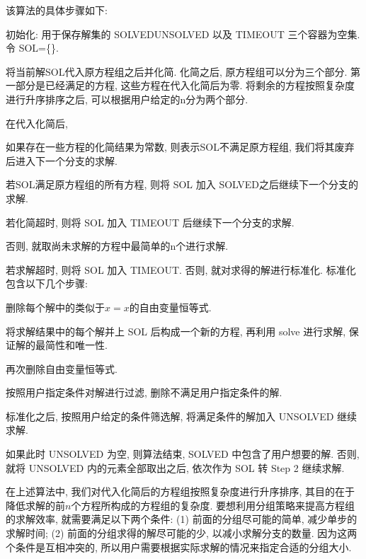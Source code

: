 该算法的具体步骤如下:
\begin{compactenum}[Step 1.]
\item 初始化: 用于保存解集的 SOLVED\D UNSOLVED 以及 TIMEOUT 三个容器为空集. 令 SOL=\{\}. 
\item 将当前解SOL代入原方程组之后并化简. 化简之后, 原方程组可以分为三个部分. 第一部分是已经满足的方程, 这些方程在代入化简后为零. 将剩余的方程按照复杂度进行升序排序之后, 可以根据用户给定的n分为两个部分. 
\item 在代入化简后, 
    \begin{compactenum}[(a)]
    \item 如果存在一些方程的化简结果为常数, 则表示SOL不满足原方程组, 我们将其废弃后进入下一个分支的求解. 
    \item 若SOL满足原方程组的所有方程, 则将 SOL 加入 SOLVED之后继续下一个分支的求解. 
    \item 若化简超时, 则将 SOL 加入 TIMEOUT 后继续下一个分支的求解. 
    \item 否则, 就取尚未求解的方程中最简单的n个进行求解.
    \end{compactenum}
\item 若求解超时, 则将 SOL 加入 TIMEOUT. 否则, 就对求得的解进行标准化. 标准化包含以下几个步骤:
    \begin{compactenum}[(1)]
    \item 删除每个解中的类似于$x=x$的自由变量恒等式.
    \item 将求解结果中的每个解并上 SOL 后构成一个新的方程, 再利用 solve 进行求解, 保证解的最简性和唯一性. 
    \item 再次删除自由变量恒等式.
    \item 按照用户指定条件对解进行过滤, 删除不满足用户指定条件的解. 
    \end{compactenum}
\item 标准化之后, 按照用户给定的条件筛选解, 将满足条件的解加入 UNSOLVED 继续求解. 
\item 如果此时 UNSOLVED 为空, 则算法结束, SOLVED 中包含了用户想要的解. 否则, 就将 UNSOLVED 内的元素全部取出之后, 依次作为 SOL 转 Step 2 继续求解. 
\end{compactenum}

在上述算法中, 我们对代入化简后的方程组按照复杂度进行升序排序, 其目的在于降低求解的前$n$个方程所构成的方程组的复杂度.  要想利用分组策略来提高方程组的求解效率, 就需要满足以下两个条件: (1) 前面的分组尽可能的简单, 减少单步的求解时间; (2) 前面的分组求得的解尽可能的少, 以减小求解分支的数量. 因为这两个条件是互相冲突的, 所以用户需要根据实际求解的情况来指定合适的分组大小. 

